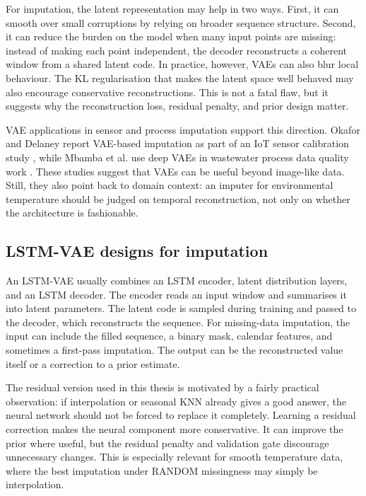 For imputation, the latent representation may help in two ways. First, it can smooth over small corruptions by relying on broader sequence structure. Second, it can reduce the burden on the model when many input points are missing: instead of making each point independent, the decoder reconstructs a coherent window from a shared latent code. In practice, however, VAEs can also blur local behaviour. The KL regularisation that makes the latent space well behaved may also encourage conservative reconstructions. This is not a fatal flaw, but it suggests why the reconstruction loss, residual penalty, and prior design matter.

VAE applications in sensor and process imputation support this direction. Okafor and Delaney report VAE-based imputation as part of an IoT sensor calibration study \cite{Okafor2021}, while Mbamba et al. use deep VAEs in wastewater process data quality work \cite{Mbamba2025EnhancingDQ}. These studies suggest that VAEs can be useful beyond image-like data. Still, they also point back to domain context: an imputer for environmental temperature should be judged on temporal reconstruction, not only on whether the architecture is fashionable.

\subsection{LSTM-VAE designs for imputation}

An LSTM-VAE usually combines an LSTM encoder, latent distribution layers, and an LSTM decoder. The encoder reads an input window and summarises it into latent parameters. The latent code is sampled during training and passed to the decoder, which reconstructs the sequence. For missing-data imputation, the input can include the filled sequence, a binary mask, calendar features, and sometimes a first-pass imputation. The output can be the reconstructed value itself or a correction to a prior estimate.

The residual version used in this thesis is motivated by a fairly practical observation: if interpolation or seasonal KNN already gives a good answer, the neural network should not be forced to replace it completely. Learning a residual correction makes the neural component more conservative. It can improve the prior where useful, but the residual penalty and validation gate discourage unnecessary changes. This is especially relevant for smooth temperature data, where the best imputation under RANDOM missingness may simply be interpolation.

